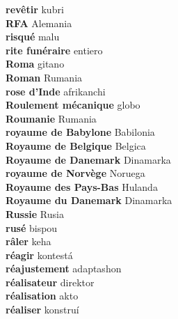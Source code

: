 \textbf{ revêtir  } kubri \\
\textbf{ RFA  } Alemania \\
\textbf{ risqué  } malu \\
\textbf{ rite funéraire  } entiero \\
\textbf{ Roma  } gitano \\
\textbf{ Roman  } Rumania \\
\textbf{ rose d’Inde  } afrikanchi \\
\textbf{ Roulement mécanique  } globo \\
\textbf{ Roumanie  } Rumania \\
\textbf{ royaume de Babylone  } Babilonia \\
\textbf{ Royaume de Belgique  } Belgica \\
\textbf{ Royaume de Danemark  } Dinamarka \\
\textbf{ royaume de Norvège  } Noruega \\
\textbf{ Royaume des Pays-Bas  } Hulanda \\
\textbf{ Royaume du Danemark  } Dinamarka \\
\textbf{ Russie  } Rusia \\
\textbf{ rusé  } bispou \\
\textbf{ râler  } keha \\
\textbf{ réagir  } kontestá \\
\textbf{ réajustement  } adaptashon \\
\textbf{ réalisateur  } direktor \\
\textbf{ réalisation  } akto \\
\textbf{ réaliser  } konstruí \\

